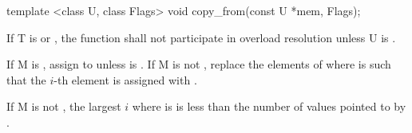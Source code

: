 \begin{itemdecl}
template <class U, class Flags> void copy_from(const U *mem, Flags);
\end{itemdecl}
\begin{itemdescr}
  \pnum\remarks If \type T is \bool or , the function shall not participate in overload resolution unless \type U is \bool.

  \pnum\effects If \type M is \bool, assign  to  unless  is \false.
  If \type M is not \bool, replace the elements of  where  is \true such that the $i$-th element is assigned with  \foralli[M::].

  \pnum\requires If \type M is not \bool, the largest $i$ where  is \true is less than the number of values pointed to by .

\end{itemdescr}

